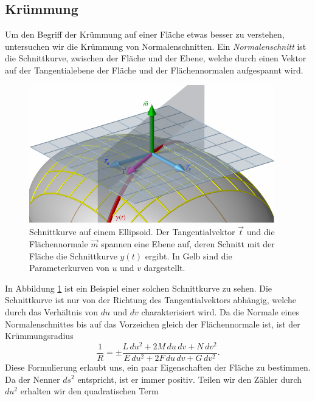 \subsection{Krümmung}
Um den Begriff der Krümmung auf einer Fläche etwas besser zu verstehen,
untersuchen wir die Krümmung von Normalenschnitten.
%
Ein \emph{Normalenschnitt} ist die Schnittkurve, zwischen der Fläche und der Ebene, welche durch einen Vektor auf 
%
der Tangentialebene der Fläche und der Flächennormalen aufgespannt wird.
\begin{figure}
  \begin{center}
    \includegraphics[width=0.95\textwidth]{papers/mongeampere/images/schnittkurven.pdf}
  \end{center}
  \caption{Schnittkurve auf einem Ellipsoid. Der Tangentialvektor $\vec t$ und die Flächennormale $\vec m$ spannen eine Ebene auf, 
  deren Schnitt mit der Fläche die Schnittkurve $y(t)$ ergibt. In Gelb sind die Parameterkurven von $u$ und $v$ dargestellt.}\label{mongeampere:fig:schnitt}
\end{figure}
In Abbildung \ref{mongeampere:fig:schnitt} ist ein Beispiel einer solchen Schnittkurve zu sehen.
Die Schnittkurve ist nur von der Richtung des Tangentialvektors abhängig, welche durch das Verhältnis von $d u$ und $d v$ charakterisiert wird.
Da die Normale eines Normalenschnittes bis auf das Vorzeichen gleich der Flächennormale ist, ist der 
Krümmungsradius
\begin{equation}
  \frac{1}{R} = \pm \frac{L \,d u^2 + 2 M \,d u\,d v + N \,d v^2}
                  {E \,d u^2 + 2F \,d u \, d v + G\,d v^2}.
  \label{mongeampere:normkrum}
\end{equation}
Diese Formulierung erlaubt uns, ein paar Eigenschaften der Fläche zu bestimmen.
Da der Nenner $d s^2$ entspricht, ist er immer positiv. 
Teilen wir den Zähler durch $d u^2$ erhalten wir den quadratischen Term
